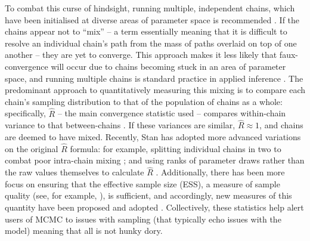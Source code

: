\documentclass{article}
\begin{document}
To combat this curse of hindsight, running multiple, independent chains, which have been initialised at diverse areas of parameter space is recommended \citep{gelman1992inference}. If the chains appear not to ``mix'' -- a term essentially meaning that it is difficult to resolve an individual chain's path from the mass of paths overlaid on top of one another -- they are yet to converge. This approach makes it less likely that faux-convergence will occur due to chains becoming stuck in an area of parameter space, and running multiple chains is standard practice in applied inference \citep{lambert2018Student}. The predominant approach to quantitatively measuring this mixing is to compare each chain's sampling distribution to that of the population of chains as a whole: specifically, $\widehat{R}$ -- the main convergence statistic used -- compares within-chain variance to that between-chains \citep{gelman1992inference}. If these variances are similar, $\widehat{R}\approx 1$, and chains are deemed to have mixed. Recently, Stan has adopted more advanced variations on the original $\widehat{R}$ formula: for example, splitting individual chains in two to combat poor intra-chain mixing \citep{gelman2013bayesian}; and using ranks of parameter draws rather than the raw values themselves to calculate $\widehat{R}$ \citep{vehtari2019rank}. Additionally, there has been more focus on ensuring that the effective sample size (ESS), a measure of sample quality (see, for example, \cite{lambert2018Student}), is sufficient, and accordingly, new measures of this quantity have been proposed \citep{vehtari2019rank} and adopted \citep{carpenter2017stan}. Collectively, these statistics help alert users of MCMC to issues with sampling (that typically echo issues with the model) meaning that all is not hunky dory.
\end{document}
